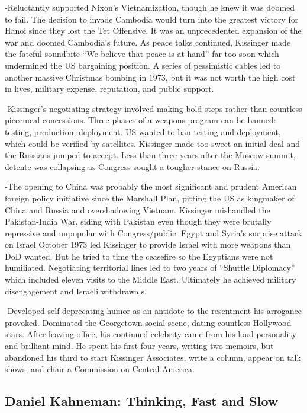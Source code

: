 \documentclass[
]{article}
\begin{document}
-Reluctantly supported Nixon's Vietnamization, though he knew it was
doomed to fail. The decision to invade Cambodia would turn into the
greatest victory for Hanoi since they lost the Tet Offensive. It was an
unprecedented expansion of the war and doomed Cambodia's future. As
peace talks continued, Kissinger made the fateful soundbite ``We believe
that peace is at hand'' far too soon which undermined the US bargaining
position. A series of pessimistic cables led to another massive
Christmas bombing in 1973, but it was not worth the high cost in lives,
military expense, reputation, and public support.

-Kissinger's negotiating strategy involved making bold steps rather than
countless piecemeal concessions. Three phases of a weapons program can
be banned: testing, production, deployment. US wanted to ban testing and
deployment, which could be verified by satellites. Kissinger made too
sweet an initial deal and the Russians jumped to accept. Less than three
years after the Moscow summit, detente was collapsing as Congress sought
a tougher stance on Russia.

-The opening to China was probably the most significant and prudent
American foreign policy initiative since the Marshall Plan, pitting the
US as kingmaker of China and Russia and overshadowing Vietnam. Kissinger
mishandled the Pakistan-India War, siding with Pakistan even though they
were brutally repressive and unpopular with Congress/public. Egypt and
Syria's surprise attack on Israel October 1973 led Kissinger to provide
Israel with more weapons than DoD wanted. But he tried to time the
ceasefire so the Egyptians were not humiliated. Negotiating territorial
lines led to two years of ``Shuttle Diplomacy'' which included eleven
visits to the Middle East. Ultimately he achieved military disengagement
and Israeli withdrawals.

-Developed self-deprecating humor as an antidote to the resentment his
arrogance provoked. Dominated the Georgetown social scene, dating
countless Hollywood stars. After leaving office, his continued celebrity
came from his loud personality and brilliant mind. He spent his first
four years, writing two memoirs, but abandoned his third to start
Kissinger Associates, write a column, appear on talk shows, and chair a
Commission on Central America.

\hypertarget{daniel-kahneman-thinking-fast-and-slow}{%
\subsection{Daniel Kahneman: Thinking, Fast and
Slow}\label{daniel-kahneman-thinking-fast-and-slow}}
\end{document}
